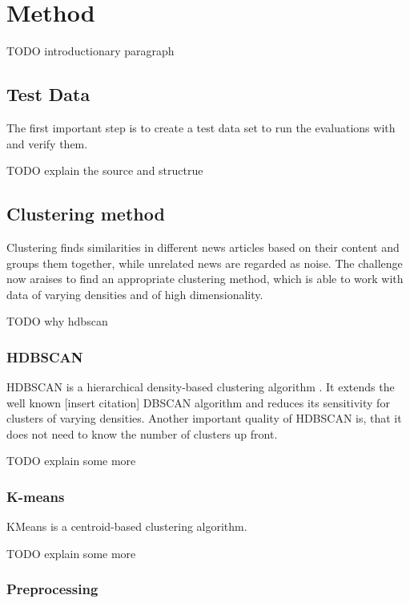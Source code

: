 \section{Method}

TODO introductionary paragraph

\subsection{Test Data}

The first important step is to create a test data set to run the evaluations with and verify them.

TODO explain the source and structrue

\subsection{Clustering method}

Clustering finds similarities in different news articles based on their content and groups them together, while unrelated news are regarded as noise. The challenge now araises to find an appropriate clustering method, which is able to work with data of varying densities and of high dimensionality.

TODO why hdbscan

\subsubsection{HDBSCAN}

HDBSCAN is a hierarchical density-based clustering algorithm \cite{McInnes2017}. It extends the well known [insert citation] DBSCAN algorithm and reduces its sensitivity for clusters of varying densities. Another important quality of HDBSCAN is, that it does not need to know the number of clusters up front.

 TODO explain some more

\subsubsection{K-means}

KMeans is a centroid-based clustering algorithm. 

 TODO explain some more

\subsubsection{Preprocessing}

